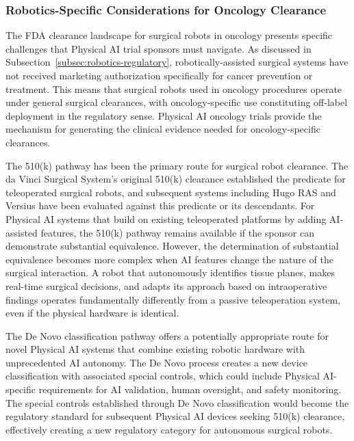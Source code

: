 \subsubsection{Robotics-Specific Considerations for Oncology Clearance}

The FDA clearance landscape for surgical robots in oncology presents specific
challenges that Physical AI trial sponsors must navigate. As discussed in
Subsection~\ref{subsec:robotics-regulatory}, robotically-assisted surgical
systems have not received marketing authorization specifically for cancer
prevention or treatment. This means that surgical robots used in oncology
procedures operate under general surgical clearances, with oncology-specific
use constituting off-label deployment in the regulatory sense. Physical AI
oncology trials provide the mechanism for generating the clinical evidence
needed for oncology-specific clearances.

The 510(k) pathway has been the primary route for surgical robot clearance.
The da Vinci Surgical System's original 510(k) clearance established the
predicate for teleoperated surgical robots, and subsequent systems including
Hugo RAS and Versius have been evaluated against this predicate or its
descendants. For Physical AI systems that build on existing teleoperated
platforms by adding AI-assisted features, the 510(k) pathway remains
available if the sponsor can demonstrate substantial equivalence. However,
the determination of substantial equivalence becomes more complex when AI
features change the nature of the surgical interaction. A robot that
autonomously identifies tissue planes, makes real-time surgical decisions,
and adapts its approach based on intraoperative findings operates
fundamentally differently from a passive teleoperation system, even if the
physical hardware is identical.

The De Novo classification pathway offers a potentially appropriate route
for novel Physical AI systems that combine existing robotic hardware with
unprecedented AI autonomy. The De Novo process creates a new device
classification with associated special controls, which could include Physical
AI-specific requirements for AI validation, human oversight, and safety
monitoring. The special controls established through De Novo classification
would become the regulatory standard for subsequent Physical AI devices
seeking 510(k) clearance, effectively creating a new regulatory category
for autonomous surgical robots.

